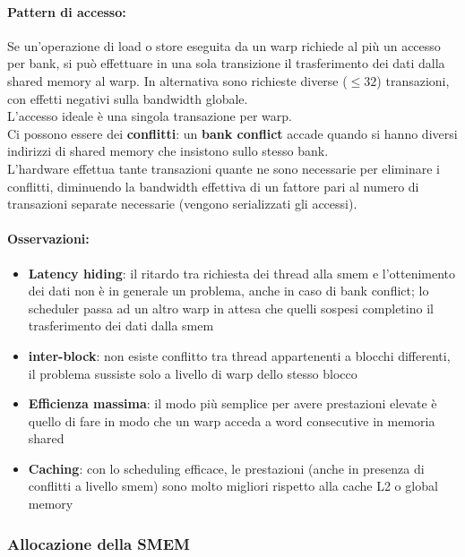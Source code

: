 \newpage

\paragraph{Pattern di accesso:} Se un'operazione di load o store eseguita da un warp richiede al più un accesso per bank, si può effettuare in una sola transizione il trasferimento dei dati dalla shared memory al warp. In alternativa sono richieste diverse ($\leq 32$) transazioni, con effetti negativi sulla bandwidth globale.\\

L'accesso ideale è una singola transazione per warp.\\

Ci possono essere dei \textbf{conflitti}: un \textbf{bank conflict} accade quando si hanno diversi indirizzi di shared memory che insistono sullo stesso bank.\\
L'hardware effettua tante transazioni quante ne sono necessarie per eliminare i conflitti, diminuendo la bandwidth effettiva di un fattore pari al numero di transazioni separate necessarie (vengono serializzati gli accessi).\\

\paragraph{Osservazioni:}
\begin{itemize}
	\item \textbf{Latency hiding}: il ritardo tra richiesta dei thread alla smem e l'ottenimento dei dati non è in generale un problema, anche in caso di bank conflict; lo scheduler passa ad un altro warp in attesa che quelli sospesi completino il trasferimento dei dati dalla smem
	\item \textbf{inter-block}: non esiste conflitto tra thread appartenenti a blocchi differenti, il problema sussiste solo a livello di warp dello stesso blocco 
	\item \textbf{Efficienza massima}: il modo più semplice per avere prestazioni elevate è quello di fare in modo che un warp acceda a word consecutive in memoria shared
	\item \textbf{Caching}: con lo scheduling efficace, le prestazioni (anche in presenza di conflitti a livello smem) sono molto migliori rispetto alla cache L2 o global memory
\end{itemize}

\newpage

\subsubsection{Allocazione della SMEM}


